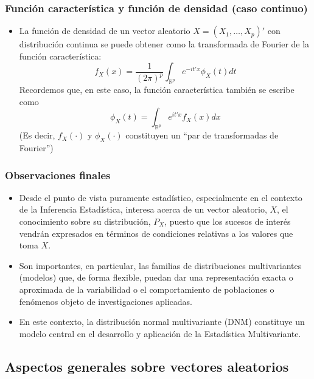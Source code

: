 \documentclass[11pt,a4paper]{article}
\begin{document}
\subsubsection{Función característica y función de densidad (caso continuo)}
\begin{itemize}
\item La función de densidad de un vector aleatorio $X = (X_{1}, \dots, X_{p})'$ con distribución continua se puede obtener como la transformada de Fourier de la función característica:
$$f_{X}(x) = \frac{1}{(2\pi)^{p}} \int_{\mathbb{R}^{p}} e^{-it'x} \phi_{X}(t) dt$$
Recordemos que, en este caso, la función característica también se escribe como
$$\phi_{X}(t) = \int_{\mathbb{R}^{p}} e^{it'x}f_{X}(x) dx$$
(Es decir, $f_{X}(\cdot)$ y $\phi_{X}(\cdot)$ constituyen un ``par de transformadas de Fourier'')
\end{itemize}

\subsubsection{Observaciones finales}
\begin{itemize}
\item Desde el punto de vista puramente estadístico, especialmente en el contexto de la Inferencia Estadística, interesa acerca de un vector aleatorio, $X$, el conocimiento sobre su distribución, $P_{X}$, puesto que los sucesos de interés vendrán expresados en términos de condiciones relativas a los valores que toma $X$.

\item Son importantes, en particular, las familias de distribuciones multivariantes (modelos) que, de forma flexible, puedan dar una representación exacta o aproximada de la variabilidad o el comportamiento de poblaciones o fenómenos objeto de investigaciones aplicadas.

\item En este contexto, la distribución normal multivariante (DNM) constituye un modelo central en el desarrollo y aplicación de la Estadística Multivariante.
\end{itemize}

\subsection{Aspectos generales sobre vectores aleatorios}
\end{document}
